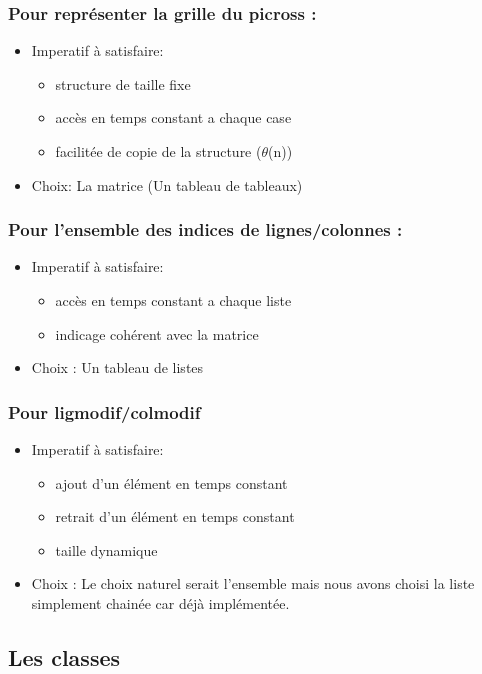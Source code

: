 \documentclass{article}
\begin{document}
\subsubsection{Pour représenter la grille du picross :}
\begin{itemize}
\item Imperatif à satisfaire:
\begin{itemize}
\item structure de taille fixe
\item accès en temps constant a chaque case
\item facilitée de copie de la structure ($\theta$(n))
\end{itemize}
\item Choix: La matrice (Un tableau de tableaux)
\end{itemize}
\subsubsection{Pour l'ensemble des indices de lignes/colonnes :}
\begin{itemize}
\item Imperatif à satisfaire:
\begin{itemize}
\item accès en temps constant a chaque liste
\item indicage cohérent avec la matrice
\end{itemize}
\item Choix : Un tableau de listes
\end{itemize}
\subsubsection{Pour ligmodif/colmodif}
\begin{itemize}
\item Imperatif à satisfaire:
\begin{itemize}
\item ajout d'un élément en temps constant
\item retrait d'un élément en temps constant
\item taille dynamique
\end{itemize}
\item Choix :
Le choix naturel serait l'ensemble mais nous avons choisi la liste simplement chainée car déjà implémentée.
\end{itemize}
\newpage

\subsection{Les classes}
\end{document}
